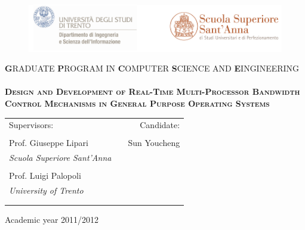 \thispagestyle{empty}
\begin{center}
\begin{figure}[htbp]
        \centering
        \includegraphics[width=\textwidth]{images/logo}
\end{figure}
\vskip5mm
\textsc{{\bf\large G}RADUATE {\bf\large P}ROGRAM IN {\bf\large C}OMPUTER 
	{\bf\large S}CIENCE AND {\bf\large E}INGINEERING} \\
\hrulefill \\%
\vfill
\textsc{ %
\textbf{\huge Design and Development of Real-Time Multi-Processor Bandwidth
	Control Mechanisms in General Purpose Operating Systems\\}
}
\vfill
\vskip20mm

\begin{tabular*}{\textwidth}{@{\extracolsep{\fill}}lcr}
Supervisors:                        & \hfill & Candidate: \\
& & \\
Prof. Giuseppe Lipari                & \hfill & Sun Youcheng\\
\emph{\scriptsize Scuola Superiore Sant'Anna } & \hfill & \\
& & \\
Prof.  Luigi Palopoli & \hfill & \\
\emph{\scriptsize University of Trento }        & \hfill & \\
& & \\
& & \\
\end{tabular*}


\par
Academic year 2011/2012
\end{center}
